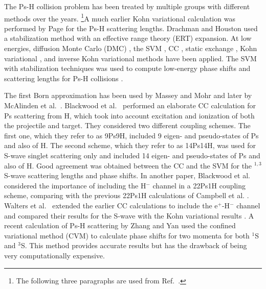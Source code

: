 \documentclass[Dissertation.tex]{subfiles}
\begin{document}
The Ps-H collision problem has been treated by multiple groups with different
methods over the years. %
\footnote{The following three paragraphs are used from Ref.~\cite{Woods2015}.}A much 
earlier Kohn variational calculation was performed by Page \cite{Page1976} 
for the Ps-H scattering lengths. Drachman and Houston
\cite{Drachman1975,Drachman1976} used
a stabilization method with an effective range theory (ERT) expansion.
At low energies, diffusion Monte Carlo (DMC)
\cite{Chiesa2002}, the SVM \cite{Ivanov2001,Ivanov2002}, CC
\cite{Sinha1997,Campbell1998,Adhikari1999,Sinha2000,Blackwood2002,Blackwood2002b,Walters2004},
static exchange \cite{Hara1975,Ray1996,Ray1997}, Kohn variational
\cite{Page1976,VanReeth2003,VanReeth2004}, and inverse Kohn
variational \cite{VanReeth2003,VanReeth2004} methods have been applied. The SVM
with stabilization 
techniques was used to compute low-energy phase shifts and 
scattering lengths for Ps-H collisions \cite{Ivanov2001,Ivanov2002}.

The first Born approximation has been used by Massey and Mohr \cite{Massey1954}
and later by McAlinden et al.~\cite{McAlinden1996}.
Blackwood et al.~\cite{Blackwood2002} performed an elaborate CC calculation 
for Ps scattering from H, which took into account excitation and ionization 
of both the projectile and target. They considered two different coupling 
schemes. The first one, which they refer to as 9Ps9H, included 9 eigen- and 
pseudo-states of Ps and also of H. The second scheme, which they refer to as 
14Ps14H, was used for S-wave singlet scattering only and included
14 eigen- and pseudo-states of 
Ps and also of H. Good agreement was obtained between the CC
\cite{Blackwood2002} and the SVM \cite{Ivanov2002} for the $^{1,3}$S-wave scattering
lengths and phase shifts. In another paper, Blackwood et
al.~\cite{Blackwood2002b} considered the importance of including the H$^-$
channel in a 22Ps1H coupling scheme, comparing with the previous 22Ps1H
calculations of Campbell et al. \cite{Campbell1998}. Walters et
al.~\cite{Walters2004} extended the earlier CC calculations
\cite{Blackwood2002} to include the e$^+$-H$^-$ channel
\cite{Blackwood2002b} and compared their results for the S-wave with the
Kohn variational results \cite{VanReeth2003}.
A recent calculation of Ps-H scattering by Zhang and Yan
\cite{Zhang2012} used the
confined variational method (CVM) to calculate phase shifts for two momenta
for both $^1$S and $^3$S. This method provides accurate
results but has the drawback of being very computationally expensive.
\end{document}
